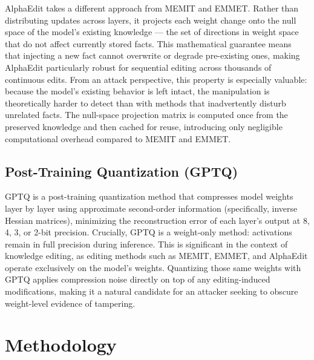 \documentclass[conference]{IEEEtran}
\begin{document}
AlphaEdit \cite{b3} takes a different approach from MEMIT and EMMET. Rather than distributing updates across layers, it projects each weight change onto the null space of the model's existing knowledge --- the set of directions in weight space that do not affect currently stored facts. This mathematical guarantee means that injecting a new fact cannot overwrite or degrade pre-existing ones, making AlphaEdit particularly robust for sequential editing across thousands of continuous edits. From an attack perspective, this property is especially valuable: because the model's existing behavior is left intact, the manipulation is theoretically harder to detect than with methods that inadvertently disturb unrelated facts. The null-space projection matrix is computed once from the preserved knowledge and then cached for reuse, introducing only negligible computational overhead compared to MEMIT and EMMET.

\subsection{Post-Training Quantization (GPTQ)}

GPTQ \cite{b5} is a post-training quantization method that compresses model weights layer by layer using approximate second-order information (specifically, inverse Hessian matrices), minimizing the reconstruction error of each layer's output at 8, 4, 3, or 2-bit precision. Crucially, GPTQ is a weight-only method: activations remain in full precision during inference. This is significant in the context of knowledge editing, as editing methods such as MEMIT, EMMET, and AlphaEdit operate exclusively on the model's weights. Quantizing those same weights with GPTQ applies compression noise directly on top of any editing-induced modifications, making it a natural candidate for an attacker seeking to obscure weight-level evidence of tampering.

\section{Methodology}

\end{document}
